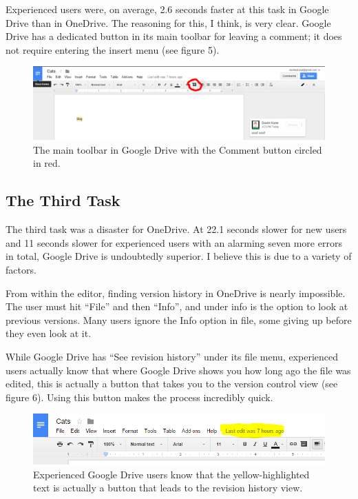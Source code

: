 \documentclass[a4paper,12pt]{article}
\begin{document}
Experienced users were, on average, 2.6 seconds faster at this task in Google Drive than in OneDrive. The reasoning for this, I think, is very clear. Google Drive has a dedicated button in its main toolbar for leaving a comment; it does not require entering the insert menu (see figure 5).

\begin{figure}[h]
\centering
\includegraphics[width=\textwidth]{drivecommentbutton}
\caption{The main toolbar in Google Drive with the Comment button circled in red.}
\end{figure}

\subsection{The Third Task}

The third task was a disaster for OneDrive. At 22.1 seconds slower for new users and 11 seconds slower for experienced users with an alarming seven more errors in total, Google Drive is undoubtedly superior. I believe this is due to a variety of factors.

From within the editor, finding version history in OneDrive is nearly impossible. The user must hit ``File'' and then ``Info'', and under info is the option to look at previous versions. Many users ignore the Info option in file, some giving up before they even look at it.

While Google Drive has ``See revision history'' under its file menu, experienced users actually know that where Google Drive shows you how long ago the file was edited, this is actually a button that takes you to the version control view (see figure 6). Using this button makes the process incredibly quick.

\begin{figure}[h]
\centering
\includegraphics[width=\textwidth]{lastedited}
\caption{Experienced Google Drive users know that the yellow-highlighted text is actually a button that leads to the revision history view.}
\end{figure}
\end{document}
